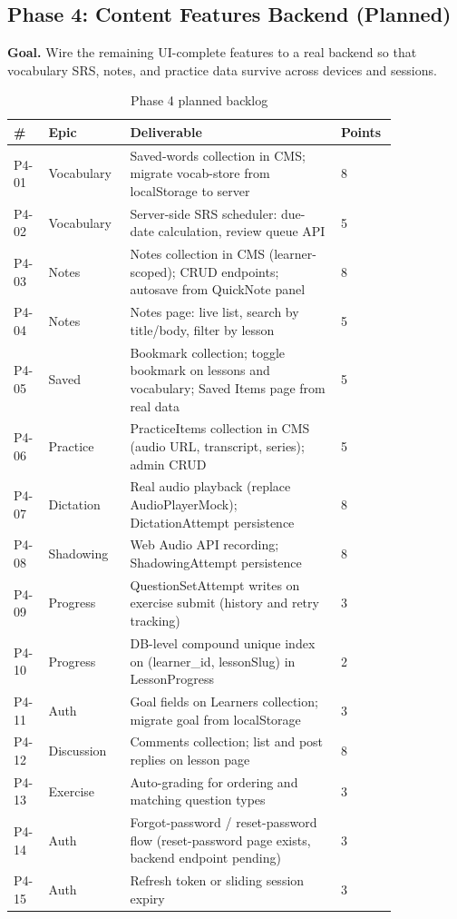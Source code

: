\subsection{Phase 4: Content Features Backend (Planned)}
\label{sec:phase4}

\textbf{Goal.} Wire the remaining UI-complete features to a real backend so that vocabulary SRS, notes, and practice data survive across devices and sessions.

\begin{longtable}{p{0.08\linewidth} p{0.16\linewidth} p{0.50\linewidth} p{0.10\linewidth}}
\caption{Phase 4 planned backlog}\\
\toprule
\# & Epic & Deliverable & Points \\
\midrule
\endhead
P4-01 & Vocabulary & Saved-words collection in CMS; migrate vocab-store from localStorage to server & 8 \\
P4-02 & Vocabulary & Server-side SRS scheduler: due-date calculation, review queue API & 5 \\
P4-03 & Notes & Notes collection in CMS (learner-scoped); CRUD endpoints; autosave from QuickNote panel & 8 \\
P4-04 & Notes & Notes page: live list, search by title/body, filter by lesson & 5 \\
P4-05 & Saved & Bookmark collection; toggle bookmark on lessons and vocabulary; Saved Items page from real data & 5 \\
P4-06 & Practice & PracticeItems collection in CMS (audio URL, transcript, series); admin CRUD & 5 \\
P4-07 & Dictation & Real audio playback (replace AudioPlayerMock); DictationAttempt persistence & 8 \\
P4-08 & Shadowing & Web Audio API recording; ShadowingAttempt persistence & 8 \\
P4-09 & Progress & QuestionSetAttempt writes on exercise submit (history and retry tracking) & 3 \\
P4-10 & Progress & DB-level compound unique index on (learner\_id, lessonSlug) in LessonProgress & 2 \\
P4-11 & Auth & Goal fields on Learners collection; migrate goal from localStorage & 3 \\
P4-12 & Discussion & Comments collection; list and post replies on lesson page & 8 \\
P4-13 & Exercise & Auto-grading for ordering and matching question types & 3 \\
P4-14 & Auth & Forgot-password / reset-password flow (reset-password page exists, backend endpoint pending) & 3 \\
P4-15 & Auth & Refresh token or sliding session expiry & 3 \\
\bottomrule
\end{longtable}

